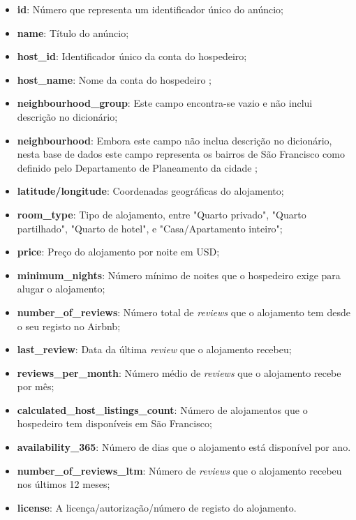 \documentclass[a4paper, justified]{tufte-handout}\usepackage[]{graphicx}\usepackage[]{xcolor}
\begin{document}
\begin{itemize}
  \item \textbf{id}: Número que representa um identificador único do anúncio;
  \item \textbf{name}: Título do anúncio;
  \item \textbf{host\_id}: Identificador único da conta do hospedeiro;
  \item \textbf{host\_name}: Nome da conta do hospedeiro ;
  \item \textbf{neighbourhood\_group}: Este campo encontra-se vazio e não inclui descrição no dicionário;
  \item \textbf{neighbourhood}: Embora este campo não inclua descrição no dicionário, nesta base de dados este campo representa os bairros de São Francisco como definido pelo Departamento de Planeamento da cidade ;
  \item \textbf{latitude/longitude}: Coordenadas geográficas do alojamento;
  \item \textbf{room\_type}: Tipo de alojamento, entre "Quarto privado", "Quarto partilhado", "Quarto de hotel", e "Casa/Apartamento inteiro";
  \item \textbf{price}: Preço do alojamento por noite em USD;
  \item \textbf{minimum\_nights}: Número mínimo de noites que o hospedeiro exige para alugar o alojamento;
  \item \textbf{number\_of\_reviews}: Número total de \textit{reviews} que o alojamento tem desde o seu registo no Airbnb;
  \item \textbf{last\_review}: Data da última \textit{review} que o alojamento recebeu;
  \item \textbf{reviews\_per\_month}: Número médio de \textit{reviews} que o alojamento recebe por mês;
  \item \textbf{calculated\_host\_listings\_count}: Número de alojamentos que o hospedeiro tem disponíveis em São Francisco;
  \item \textbf{availability\_365}: Número de dias que o alojamento está disponível por ano.
  \item \textbf{number\_of\_reviews\_ltm}: Número de \textit{reviews} que o alojamento recebeu nos últimos 12 meses;
  \item \textbf{license}: A licença/autorização/número de registo do alojamento.
\end{itemize}
\end{document}
